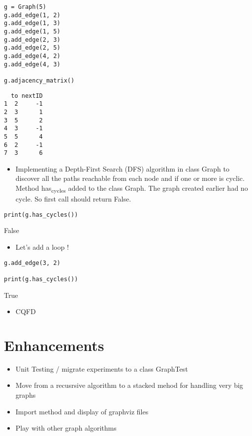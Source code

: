 \documentclass[11pt]{article}
\begin{document}
\begin{verbatim}
g = Graph(5)
g.add_edge(1, 2)
g.add_edge(1, 3)
g.add_edge(1, 5)
g.add_edge(2, 3)
g.add_edge(2, 5)
g.add_edge(4, 2)
g.add_edge(4, 3)

g.adjacency_matrix()
\end{verbatim}

\begin{verbatim}
  to nextID
1  2     -1
2  3      1
3  5      2
4  3     -1
5  5      4
6  2     -1
7  3      6
\end{verbatim}


\begin{itemize}
\item Implementing a Depth-First Search (DFS) algorithm in class Graph to discover
all the paths reachable from each node and if one or more is cyclic. Method
has\textsubscript{cycles} added to the class Graph.  The graph created earlier had no
cycle. So first call should return False.
\end{itemize}

\begin{verbatim}
print(g.has_cycles())
\end{verbatim}

False

\begin{itemize}
\item Let's add a loop !
\end{itemize}

\begin{verbatim}
g.add_edge(3, 2)

print(g.has_cycles())
\end{verbatim}

True

\begin{itemize}
\item CQFD
\end{itemize}

\section{Enhancements}
\label{sec:orge9497f4}
\begin{itemize}
\item Unit Testing / migrate experiments to a class GraphTest
\item Move from a recusrsive algorithm to a stacked mehod for handling very big
graphs
\item Import method and display of graphviz files
\item Play with other graph algorithms
\end{itemize}
\end{document}
